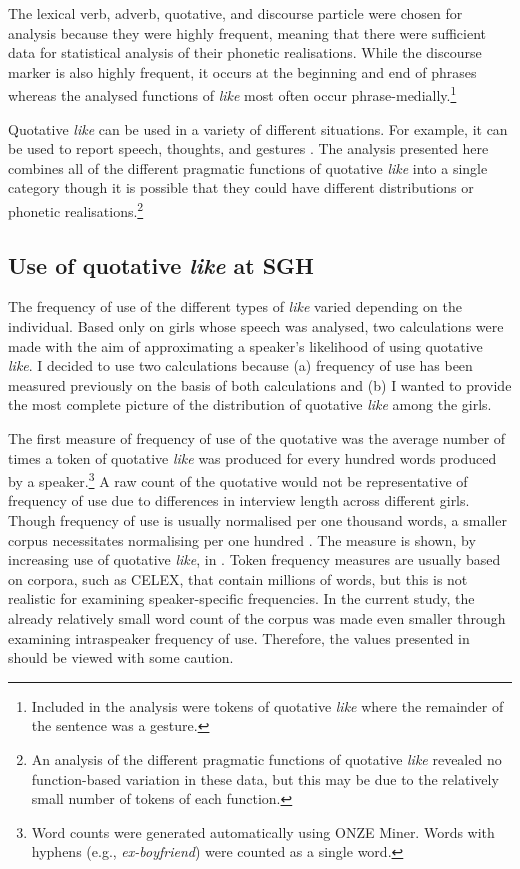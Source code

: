 \noindent The lexical verb, adverb, quotative, and discourse particle were chosen for analysis because they were highly frequent, meaning that there were sufficient data for statistical analysis of their phonetic realisations. While the discourse marker is also highly frequent, it occurs at the beginning and end of phrases whereas the analysed functions of \textit{like} most often occur phrase-medially.\footnote{Included in the analysis were tokens of quotative \textit{like} where the remainder of the sentence was a gesture.}

Quotative \textit{like} can be used in a variety of different situations. For example, it can be used to report speech, thoughts, and gestures \citep{romainelange1991}. The analysis presented here combines all of the different pragmatic functions of quotative \textit{like} into a single category though it is possible that they could have different distributions or phonetic realisations.\footnote{An analysis of the different pragmatic functions of quotative \textit{like} revealed no function-based variation in these data, but this may be due to the relatively small number of tokens of each function.}



\subsection{Use of quotative \textit{like} at SGH}\label{section:uselike}



The frequency of use of the different types of \textit{like} varied depending on the individual. Based only on girls whose speech was analysed, two calculations were made with the aim of approximating a speaker's likelihood of using quotative \textit{like}. I decided to use two calculations because (a) frequency of use has been measured previously on the basis of both calculations and (b) I wanted to provide the most complete picture of the distribution of quotative \textit{like} among the girls.

The first measure of frequency of use of the quotative was the average number of times a token of quotative \textit{like} was produced for every hundred words produced by a speaker.\footnote{Word counts were generated automatically using ONZE Miner. Words with hyphens (e.g., \textit{ex-boyfriend}) were counted as a single word.} A raw count of the quotative would not be representative of frequency of use due to differences in interview length across different girls. Though frequency of use is usually normalised per one thousand words, a smaller corpus necessitates normalising per one hundred \citep[264]{biberetal1998}. The measure is shown, by increasing use of quotative \textit{like}, in . Token frequency measures are usually based on corpora, such as CELEX, that contain millions of words, but this is not realistic for examining speaker-specific frequencies. In the current study, the already relatively small word count of the corpus was made even smaller through examining intraspeaker frequency of use. Therefore, the values presented in  should be viewed with some caution.
 

